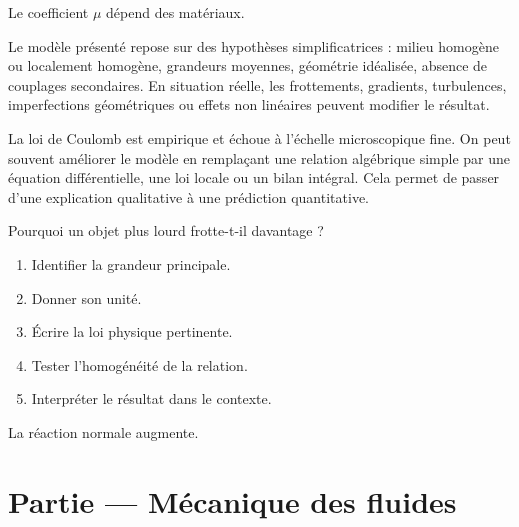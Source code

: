 \documentclass[11pt,a4paper]{article}
\begin{document}
\begin{odgbox}
Le coefficient $\mu$ dépend des matériaux.
\end{odgbox}

\begin{attentionbox}
Le modèle présenté repose sur des hypothèses simplificatrices : milieu homogène ou localement homogène, grandeurs moyennes, géométrie idéalisée, absence de couplages secondaires. En situation réelle, les frottements, gradients, turbulences, imperfections géométriques ou effets non linéaires peuvent modifier le résultat.
\end{attentionbox}

\begin{approfondissementbox}
La loi de Coulomb est empirique et échoue à l'échelle microscopique fine.
On peut souvent améliorer le modèle en remplaçant une relation algébrique simple par une équation différentielle, une loi locale ou un bilan intégral. Cela permet de passer d'une explication qualitative à une prédiction quantitative.
\end{approfondissementbox}

\begin{exercicebox}
Pourquoi un objet plus lourd frotte-t-il davantage ?
\begin{enumerate}
  \item Identifier la grandeur principale.
  \item Donner son unité.
  \item Écrire la loi physique pertinente.
  \item Tester l'homogénéité de la relation.
  \item Interpréter le résultat dans le contexte.
\end{enumerate}
\end{exercicebox}

\begin{corrigebox}[Indication]
La réaction normale augmente.
\end{corrigebox}


\section{Partie — Mécanique des fluides}


\end{document}
